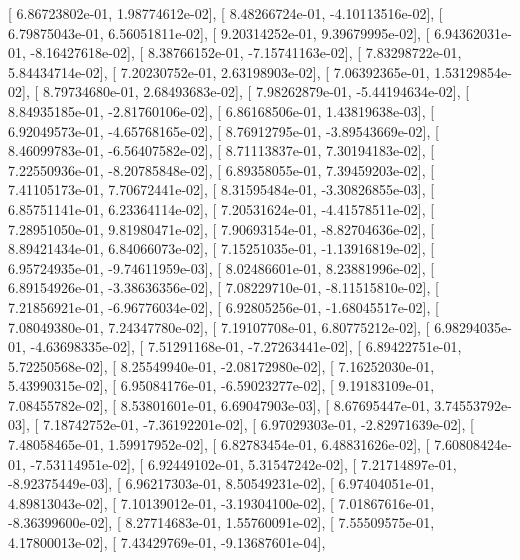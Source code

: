 \documentclass{article}
\begin{document}
       [  6.86723802e-01,   1.98774612e-02],
       [  8.48266724e-01,  -4.10113516e-02],
       [  6.79875043e-01,   6.56051811e-02],
       [  9.20314252e-01,   9.39679995e-02],
       [  6.94362031e-01,  -8.16427618e-02],
       [  8.38766152e-01,  -7.15741163e-02],
       [  7.83298722e-01,   5.84434714e-02],
       [  7.20230752e-01,   2.63198903e-02],
       [  7.06392365e-01,   1.53129854e-02],
       [  8.79734680e-01,   2.68493683e-02],
       [  7.98262879e-01,  -5.44194634e-02],
       [  8.84935185e-01,  -2.81760106e-02],
       [  6.86168506e-01,   1.43819638e-03],
       [  6.92049573e-01,  -4.65768165e-02],
       [  8.76912795e-01,  -3.89543669e-02],
       [  8.46099783e-01,  -6.56407582e-02],
       [  8.71113837e-01,   7.30194183e-02],
       [  7.22550936e-01,  -8.20785848e-02],
       [  6.89358055e-01,   7.39459203e-02],
       [  7.41105173e-01,   7.70672441e-02],
       [  8.31595484e-01,  -3.30826855e-03],
       [  6.85751141e-01,   6.23364114e-02],
       [  7.20531624e-01,  -4.41578511e-02],
       [  7.28951050e-01,   9.81980471e-02],
       [  7.90693154e-01,  -8.82704636e-02],
       [  8.89421434e-01,   6.84066073e-02],
       [  7.15251035e-01,  -1.13916819e-02],
       [  6.95724935e-01,  -9.74611959e-03],
       [  8.02486601e-01,   8.23881996e-02],
       [  6.89154926e-01,  -3.38636356e-02],
       [  7.08229710e-01,  -8.11515810e-02],
       [  7.21856921e-01,  -6.96776034e-02],
       [  6.92805256e-01,  -1.68045517e-02],
       [  7.08049380e-01,   7.24347780e-02],
       [  7.19107708e-01,   6.80775212e-02],
       [  6.98294035e-01,  -4.63698335e-02],
       [  7.51291168e-01,  -7.27263441e-02],
       [  6.89422751e-01,   5.72250568e-02],
       [  8.25549940e-01,  -2.08172980e-02],
       [  7.16252030e-01,   5.43990315e-02],
       [  6.95084176e-01,  -6.59023277e-02],
       [  9.19183109e-01,   7.08455782e-02],
       [  8.53801601e-01,   6.69047903e-03],
       [  8.67695447e-01,   3.74553792e-03],
       [  7.18742752e-01,  -7.36192201e-02],
       [  6.97029303e-01,  -2.82971639e-02],
       [  7.48058465e-01,   1.59917952e-02],
       [  6.82783454e-01,   6.48831626e-02],
       [  7.60808424e-01,  -7.53114951e-02],
       [  6.92449102e-01,   5.31547242e-02],
       [  7.21714897e-01,  -8.92375449e-03],
       [  6.96217303e-01,   8.50549231e-02],
       [  6.97404051e-01,   4.89813043e-02],
       [  7.10139012e-01,  -3.19304100e-02],
       [  7.01867616e-01,  -8.36399600e-02],
       [  8.27714683e-01,   1.55760091e-02],
       [  7.55509575e-01,   4.17800013e-02],
       [  7.43429769e-01,  -9.13687601e-04],
\end{document}
